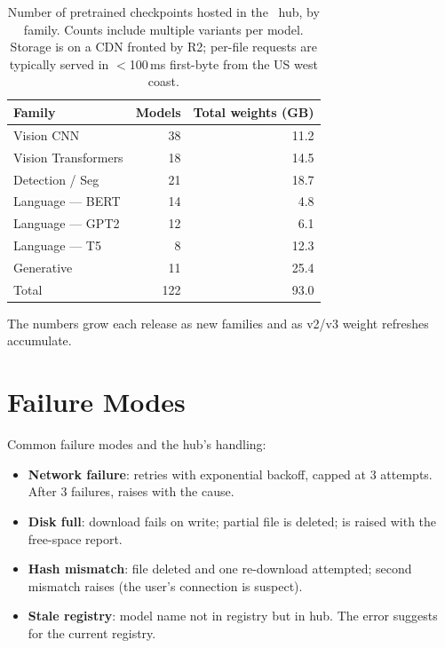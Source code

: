 \begin{table}[t]
\centering
\small
\begin{tabular}{lrr}
\toprule
Family & Models & Total weights (GB) \\
\midrule
Vision CNN          & 38 & 11.2 \\
Vision Transformers & 18 & 14.5 \\
Detection / Seg     & 21 & 18.7 \\
Language --- BERT   & 14 & 4.8  \\
Language --- GPT2   & 12 & 6.1  \\
Language --- T5     & 8  & 12.3 \\
Generative          & 11 & 25.4 \\
\midrule
Total               & 122 & 93.0 \\
\bottomrule
\end{tabular}
\caption[Lucid hub statistics.]{Number of pretrained checkpoints
hosted in the \Lucid\ hub, by family. Counts include multiple
 variants per model. Storage is on a CDN
fronted by R2; per-file requests are typically served in
\(<\)100\,ms first-byte from the US west coast.}
\label{tab:pretrained:hub_stats}
\end{table}

The numbers grow each release as new families and as v2/v3
weight refreshes accumulate.

\section{Failure Modes}
\label{sec:pretrained:failures}

Common failure modes and the hub's handling:

\begin{itemize}
  \item \textbf{Network failure}: retries with exponential
    backoff, capped at 3 attempts. After 3 failures, raises
     with the cause.
  \item \textbf{Disk full}: download fails on write; partial
    file is deleted;  is raised with the
    free-space report.
  \item \textbf{Hash mismatch}: file deleted and one re-download
    attempted; second mismatch raises
     (the user's connection is
    suspect).
  \item \textbf{Stale registry}: model name not in registry
    but in hub. The error suggests
     for the current
    registry.
\end{itemize}

